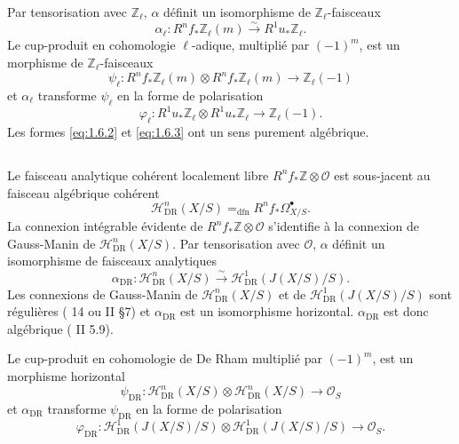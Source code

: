 \documentclass[10pt,leqno]{amsart}
\theoremstyle{plain}
\theoremstyle{definition}
\theoremstyle{remark}
\newcommand{\ZZ}{\mathbb{Z}}
\newcommand{\Oo}{\mathscr{O}}
\begin{document}
Par tensorisation avec $\ZZ_\ell$, $\alpha$ d\'efinit un isomorphisme de $\ZZ_\ell$-faisceaux
\begin{equation}\label{eq:1.6.1}
\alpha_\ell\colon R^nf_*\ZZ_\ell(m)\xrightarrow{\sim} R^1u_*\ZZ_\ell.
\end{equation}
Le cup-produit en cohomologie $\ell$-adique, multipli\'e par $(-1)^m$, est un morphisme de $\ZZ_\ell$-faisceaux
\begin{equation}\label{eq:1.6.2}
\psi_\ell\colon R^nf_*\ZZ_\ell(m)\otimes R^nf_*\ZZ_\ell(m)\to\ZZ_\ell(-1)
\end{equation}
et $\alpha_\ell$ transforme $\psi_\ell$ en la forme de polarisation
\begin{equation}\label{eq:1.6.3}
\varphi_\ell\colon R^1u_*\ZZ_\ell\otimes R^1u_*\ZZ_\ell\to\ZZ_\ell(-1).
\end{equation}
Les formes \eqref{eq:1.6.2} et \eqref{eq:1.6.3} ont un sens purement alg\'ebrique.

\subsection{}\label{1.7}

Le faisceau analytique coh\'erent localement libre $R^nf_*\ZZ\otimes\Oo$ est sous-jacent au faisceau alg\'ebrique coh\'erent
\[
\mathscr{H}^n_{\mathrm{DR}}(X/S)=_{\mathrm{dfn}}R^nf_*\Omega^\bullet_{X/S}.
\]
La connexion int\'egrable \'evidente de $R^nf_*\ZZ\otimes\Oo$ s'identifie \`a la connexion de Gauss-Manin de $\mathscr{H}^n_{\mathrm{DR}}(X/S)$. Par tensorisation avec $\Oo$, $\alpha$ d\'efinit un isomorphisme de faisceaux analytiques
\begin{equation}\label{eq:1.7.1}
\alpha_{\mathrm{DR}}\colon\mathscr{H}^n_{\mathrm{DR}}(X/S)\xrightarrow{\sim}\mathscr{H}^1_{\mathrm{DR}}(J(X/S)/S).
\end{equation}
Les connexions de Gauss-Manin de $\mathscr{H}^n_{\mathrm{DR}}(X/S)$ et de $\mathscr{H}^1_{\mathrm{DR}}(J(X/S)/S)$ sont r\'eguli\`eres (\cite{5} 14 ou \cite{2} II \S7) et $\alpha_{\mathrm{DR}}$ est un isomorphisme horizontal. $\alpha_{\mathrm{DR}}$ est donc alg\'ebrique (\cite{2} II 5.9).

Le cup-produit en cohomologie de De Rham multipli\'e par $(-1)^m$, est un morphisme horizontal
\begin{equation}\label{eq:1.7.2}
\psi_{\mathrm{DR}}\colon\mathscr{H}^n_{\mathrm{DR}}(X/S)\otimes\mathscr{H}^n_{\mathrm{DR}}(X/S)\to\Oo_S
\end{equation}
et $\alpha_{\mathrm{DR}}$ transforme $\psi_{\mathrm{DR}}$ en la forme de polarisation
\begin{equation}\label{eq:1.7.3}
\varphi_{\mathrm{DR}}\colon\mathscr{H}^1_{\mathrm{DR}}(J(X/S)/S)\otimes\mathscr{H}^1_{\mathrm{DR}}(J(X/S)/S)\to\Oo_S.
\end{equation}
\end{document}
